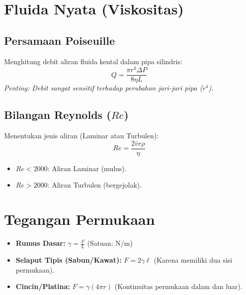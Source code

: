 \documentclass{article}
\begin{document}
\section{Fluida Nyata (Viskositas)}

\subsection{Persamaan Poiseuille}
Menghitung debit aliran fluida kental dalam pipa silindris:
$$Q = \frac{\pi r^4 \Delta P}{8 \eta L}$$
\textit{Penting: Debit sangat sensitif terhadap perubahan jari-jari pipa ($r^4$).}

\subsection{Bilangan Reynolds ($Re$)}
Menentukan jenis aliran (Laminar atau Turbulen):
$$Re = \frac{2 \bar{v} r \rho}{\eta}$$
\begin{itemize}
    \item $Re < 2000$: Aliran Laminar (mulus).
    \item $Re > 2000$: Aliran Turbulen (bergejolak).
\end{itemize}

\section{Tegangan Permukaan}
\begin{itemize}
    \item \textbf{Rumus Dasar:} $\gamma = \frac{F}{L}$ (Satuan: $\text{N/m}$)
    \item \textbf{Selaput Tipis (Sabun/Kawat):} $F = 2 \gamma \ell$ (Karena memiliki dua sisi permukaan).
    \item \textbf{Cincin/Platina:} $F = \gamma (4 \pi r)$ (Kontinuitas permukaan dalam dan luar).
\end{itemize}
\end{document}
